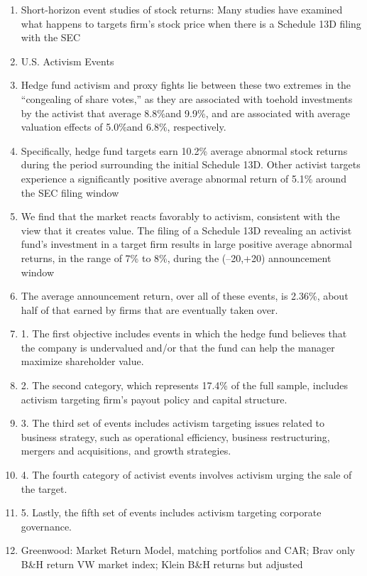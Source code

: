 \documentclass[12pt]{article}
\begin{document}
	\begin{enumerate}
		\item Short-horizon event studies of stock returns: Many studies have examined what happens to targets firm’s stock price when there is a Schedule 13D filing with the SEC \citep{CoffeeJr.2014}

		\item U.S. Activism Events 

		\item Hedge fund activism and proxy fights lie between these two extremes in the “congealing of share votes,” as they are associated with toehold investments by the activist that average 8.8\%and 9.9\%, and are associated with average valuation effects of 5.0\%and 6.8\%, respectively.\citep{Denes2017}

		\item Specifically, hedge fund targets earn 10.2\% average abnormal stock returns during the period surrounding the initial Schedule 13D. Other activist targets experience a significantly positive average abnormal return of 5.1\% around the SEC filing window \citep{Klein2009}

		\item We find that the market reacts favorably to activism, consistent with the view that it creates value. The filing of a Schedule 13D revealing an activist fund’s investment in a target firm results in large positive average abnormal returns, in the range of 7\% to 8\%, during the (–20,+20) announcement window \citep{Brav2008}

		\item The average announcement return, over all of these events, is 2.36\%, about half of that earned by firms that are eventually taken over. \citep{Greenwood2009}

	
		\item  1. The first objective includes events in which the hedge fund believes that the company is undervalued and/or that the fund can help the manager maximize shareholder value.

        \item 2. The second category, which represents 17.4\% of the full sample, includes activism targeting firm’s payout policy and capital structure.

        \item 3. The third set of events includes activism targeting issues related to business strategy, such as operational efficiency, business restructuring, mergers and acquisitions, and growth strategies.

        \item 4. The fourth category of activist events involves activism urging the sale of the target.

		\item 5. Lastly, the fifth set of events includes activism targeting corporate governance.
		
		\item Greenwood: Market Return Model, matching portfolios and CAR; Brav only B\&H return VW market index; Klein B\&H returns but adjusted 
	\end{enumerate}
\end{document}
